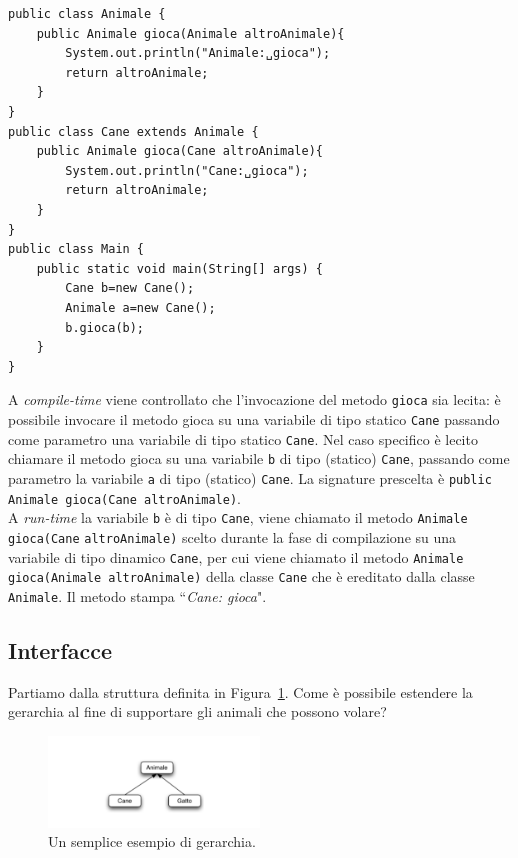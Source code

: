 \documentclass{article}
\begin{document}
\begin{lstlisting}
public class Animale {
    public Animale gioca(Animale altroAnimale){
        System.out.println("Animale:␣gioca"); 
        return altroAnimale;
    }
}
public class Cane extends Animale {
    public Animale gioca(Cane altroAnimale){ 
        System.out.println("Cane:␣gioca"); 
        return altroAnimale;
    }
}
public class Main {
    public static void main(String[] args) { 
        Cane b=new Cane();
        Animale a=new Cane();
        b.gioca(b);
    } 
}
\end{lstlisting}
A \emph{compile-time} viene controllato che l'invocazione del metodo \texttt{gioca} sia lecita: \`e possibile invocare il metodo gioca su una variabile di tipo statico \texttt{Cane} passando come parametro una variabile di tipo statico \texttt{Cane}. Nel caso specifico \`e lecito chiamare il metodo gioca su una variabile \texttt{b} di tipo (statico) \texttt{Cane}, passando come parametro la variabile \texttt{a} di tipo (statico) \texttt{Cane}.
La signature prescelta \`e \texttt{public Animale gioca(Cane altroAnimale)}. \\
A \emph{run-time} la variabile \texttt{b} \`e di tipo \texttt{Cane}, viene chiamato il metodo \texttt{Animale gioca(Cane} \texttt{altroAnimale)} scelto durante la fase di compilazione su una variabile di tipo dinamico \texttt{Cane}, per cui viene chiamato il metodo \texttt{Animale gioca(Animale altroAnimale)} della classe \texttt{Cane} che \`e ereditato dalla classe \texttt{Animale}. Il metodo stampa ``\textit{Cane: gioca}".

\subsection{Interfacce}
Partiamo dalla struttura definita in Figura~\ref{Fig:gerarchy2}. Come \`e possibile estendere la gerarchia al fine di supportare gli animali che possono volare?

\begin{figure}[h!]
  \centering
    \includegraphics[width=0.5\textwidth]{gerarchia.pdf}
      \caption{Un semplice esempio di gerarchia.}
      \label{Fig:gerarchy2}
\end{figure}
\end{document}
